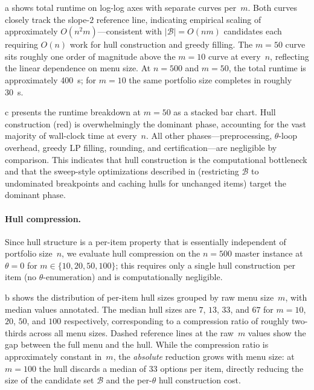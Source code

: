 \documentclass[11pt, a4paper]{article}
\theoremstyle{plain}
\theoremstyle{definition}
\theoremstyle{remark}
\begin{document}
a shows total runtime on log-log axes with separate curves per~$m$.
Both curves closely track the slope-$2$ reference line, indicating empirical scaling of
approximately $O(n^2 m)$---consistent with $|\mathcal B|=O(nm)$ candidates each requiring
$O(n)$ work for hull construction and greedy filling.
The $m=50$ curve sits roughly one order of magnitude above the $m=10$ curve at every~$n$,
reflecting the linear dependence on menu size.
At $n=500$ and $m=50$, the total runtime is approximately \SI{400}{\second}; for $m=10$ the
same portfolio size completes in roughly \SI{30}{\second}.

c presents the runtime breakdown at $m=50$ as a stacked bar chart.
Hull construction (red) is overwhelmingly the dominant phase, accounting for the vast majority
of wall-clock time at every~$n$. All other phases---preprocessing, $\theta$-loop overhead,
greedy LP filling, rounding, and certification---are negligible by comparison. This indicates
that hull construction is the computational bottleneck and that the sweep-style optimizations
described in  (restricting $\mathcal B$ to undominated breakpoints and
caching hulls for unchanged items) target the dominant phase.

\paragraph{Hull compression.}
Since hull structure is a per-item property that is essentially independent of portfolio
size~$n$, we evaluate hull compression on the $n=500$ master instance at $\theta=0$ for
$m\in\{10,20,50,100\}$; this requires only a single hull construction per item (no
$\theta$-enumeration) and is computationally negligible.

b shows the distribution of per-item hull sizes grouped by raw menu
size~$m$, with median values annotated. The median hull sizes are $7$, $13$, $33$, and $67$
for $m=10$, $20$, $50$, and $100$ respectively, corresponding to a compression ratio of
roughly two-thirds across all menu sizes. Dashed reference lines at the raw~$m$ values show
the gap between the full menu and the hull.
While the compression ratio is approximately constant in~$m$, the \emph{absolute} reduction
grows with menu size: at $m=100$ the hull discards a median of $33$ options per item,
directly reducing the size of the candidate set $\mathcal B$ and the per-$\theta$ hull
construction cost.
\end{document}

